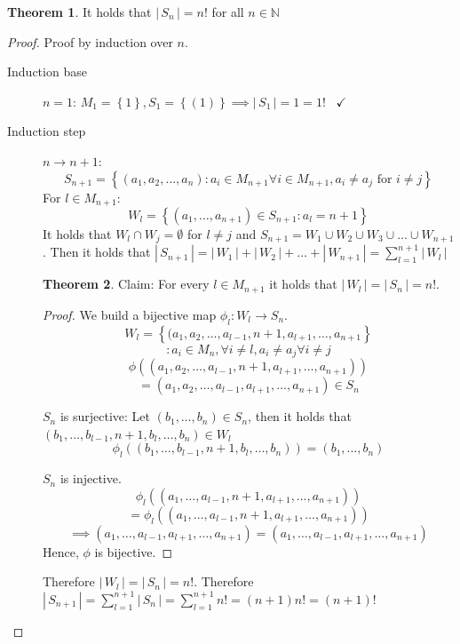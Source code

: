 \documentclass[a4paper,landscape,twocolumn]{article}
\theoremstyle{definition}
\newtheorem{theorem}{Theorem}
\newcommand\set[1]{\left\{#1\right\}}
\newcommand\card[1]{\left|\,#1\,\right|}
\newcommand\done{\hspace{10pt}\checkmark}
\begin{document}
\begin{theorem}
  It holds that $\card{S_n} = n!$ for all $n \in \mathbb{N}$
\end{theorem}
\begin{proof}
  Proof by induction over $n$.
  \begin{description}
    \item[Induction base]
      $n=1$:
        $M_1 = \set{1}, S_1 = \set{(1)} \implies \card{S_1} = 1 = 1! \done$
    \item[Induction step]
      $n\to n+1$:
        \[
          S_{n+1} = \set{(a_1, a_2, \ldots, a_n) :
              a_i \in M_{n+1} \forall i \in M_{n+1},
              a_i \neq a_j \text{ for } i \neq j}
        \]
        For $l \in M_{n+1}$: \[
          W_l = \set{(a_1, \ldots, a_{n+1}) \in S_{n+1}: a_l = n+1}
        \]
        It holds that $W_l \cap W_j = \emptyset$ for $l \neq j$
        and $S_{n+1} = W_1 \cup W_2 \cup W_3 \cup \ldots \cup W_{n+1}$.
        Then it holds that $\card{S_{n+1}} = \card{W_1} + \card{W_2} + \ldots + \card{W_{n+1}} = \sum_{l=1}^{n+1} \card{W_l}$

        \begin{theorem}
          Claim: For every $l \in M_{n+1}$ it holds that $\card{W_l} = \card{S_n} = n!$.
        \end{theorem}
        \begin{proof}
          We build a bijective map $\phi_l: W_l \to S_n$.
          \[
              W_l = \set{(a_1, a_2, \ldots, a_{l-1}, n+1, a_{l+1}, \ldots, a_{n+1}}
          \]\[
                  :a_i \in M_n, \forall i \neq l, a_i \neq a_j \forall i \neq j
          \] \[
              \phi\left((a_1, a_2, \ldots, a_{l-1}, n+1, a_{l+1}, \ldots, a_{n+1})\right)
          \] \[
                  = (a_1, a_2, \ldots, a_{l-1}, a_{l+1}, \ldots, a_{n+1}) \in S_n
          \]

          $S_n$ is surjective:
          Let $(b_1, \ldots, b_n) \in S_n$, then it holds that $(b_1, \ldots, b_{l-1}, n+1, b_l, \ldots, b_n) \in W_l$
          \[ \phi_l((b_1, \ldots, b_{l-1}, n+1, b_l, \ldots, b_n)) = (b_1, \ldots, b_n) \]

          $S_n$ is injective.
          \[
              \phi_l((a_1, \ldots, a_{l-1}, n+1, a_{l+1}, \ldots, a_{n+1}))
          \] \[
                  = \phi_l((a_1, \ldots, a_{l-1}, n+1, a_{l+1}, \dots, a_{n+1}))
          \] \[
               \implies
               (a_1, \ldots, a_{l-1}, a_{l+1}, \ldots, a_{n+1}) =
               (a_1, \ldots, a_{l-1}, a_{l+1}, \ldots, a_{n+1})
          \]
          Hence, $\phi$ is bijective.
        \end{proof}

        Therefore $\card{W_l} = \card{S_n} = n!$.
        Therefore $\card{S_{n+1}} = \sum_{l=1}^{n+1} \card{S_n} = \sum_{l=1}^{n+1} n! = (n + 1) n! = (n + 1)!$
  \end{description}
\end{proof}
\end{document}
